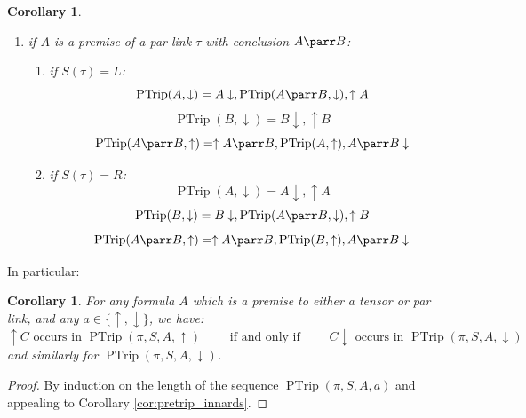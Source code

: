 \documentclass[12pt]{article}
\theoremstyle{plain}
\newtheorem{cor}[thm]{Corollary}
\theoremstyle{definition}
\begin{document}
\begin{cor}
\begin{enumerate}
\begin{enumerate}
\begin{equation}
    \end{equation}
    \end{enumerate}
    \item if $A$ is a premise of a par link $\tau$ with conclusion $A \parr B$:
    \begin{enumerate}
        \item if $S(\tau) = L$:
        \begin{equation}
            \operatorname{PTrip}(A,\downarrow) = A\downarrow, \operatorname{PTrip}(A \parr B, \downarrow), \uparrow A
        \end{equation}
        \begin{equation}
            \operatorname{PTrip}(B, \downarrow) = B\downarrow, \uparrow B
        \end{equation}
        \begin{equation}
            \operatorname{PTrip}(A \parr B, \uparrow) = \uparrow A \parr B, \operatorname{PTrip}(A, \uparrow), A \parr B \downarrow
        \end{equation}
        \item if $S(\tau) = R$:
        \begin{equation}
            \operatorname{PTrip}(A,\downarrow) = A\downarrow, \uparrow A
        \end{equation}
        \begin{equation}
            \operatorname{PTrip}(B, \downarrow) = B\downarrow, \operatorname{PTrip}(A \parr B, \downarrow), \uparrow B
        \end{equation}
        \begin{equation}
            \operatorname{PTrip}(A \parr B, \uparrow) = \uparrow A \parr B, \operatorname{PTrip}(B, \uparrow), A \parr B \downarrow
        \end{equation}
    \end{enumerate}
\end{enumerate}
\end{cor}
In particular:
\begin{cor}\label{cor:stays_contained_corollary}
For any formula $A$ which is a premise to either a tensor or par link, and any $a \in \lbrace \uparrow, \downarrow \rbrace$, we have: $$\uparrow C \text{ occurs in } \operatorname{PTrip}(\pi,S,A,\uparrow)\qquad\text{ if and only if }\qquad C\downarrow \text{ occurs in } \operatorname{PTrip}(\pi,S,A,\downarrow)$$ and similarly for $\operatorname{PTrip}(\pi,S,A,\downarrow)$.
\end{cor}
\begin{proof}
By induction on the length of the sequence $\operatorname{PTrip}(\pi,S,A,a)$ and appealing to Corollary \ref{cor:pretrip_innards}.
\end{proof}
\end{document}
